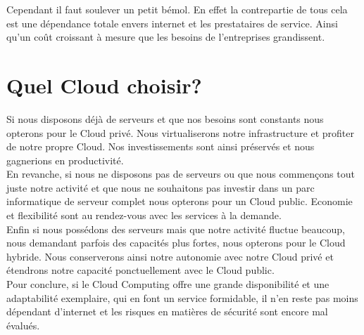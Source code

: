   Cependant il faut soulever un petit bémol. En effet la contrepartie de tous cela est une dépendance totale envers internet et les prestataires de service. Ainsi qu’un coût croissant à mesure que les besoins de l’entreprises grandissent.

  \section{Quel Cloud choisir?}
  Si nous disposons déjà de serveurs et que nos besoins sont constants nous opterons pour le Cloud privé. Nous virtualiserons notre infrastructure et profiter de notre propre Cloud. Nos investissements sont ainsi préservés et nous gagnerions en productivité.\\

  En revanche, si nous ne disposons pas de serveurs ou que nous commençons tout juste notre activité et que nous ne souhaitons pas investir dans un parc informatique de serveur complet nous opterons pour un Cloud public. Economie et flexibilité sont au rendez-vous avec les services à la demande.\\

  Enfin si nous possédons des serveurs mais que notre activité fluctue beaucoup, nous demandant parfois des capacités plus fortes, nous opterons pour le Cloud hybride. Nous conserverons ainsi notre autonomie avec notre Cloud privé et étendrons notre capacité ponctuellement avec le Cloud public.\\

  Pour conclure, si le Cloud Computing offre une grande disponibilité et une adaptabilité exemplaire, qui en font un service formidable, il n’en reste pas moins dépendant d’internet et les risques en matières de sécurité sont encore mal évalués.
